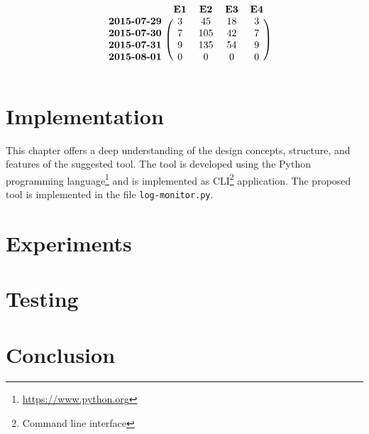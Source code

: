 \begin{equation}
    \begin{blockarray}{ccccc}
    &   \textbf{E1}&     \textbf{E2}&     \textbf{E3}&     \textbf{E4} \\
    \begin{block}{c(cccc)}
   \textbf{ 2015{\text -}07{\text -}29}&    3&      45&     18&     3 \\
   \textbf{ 2015{\text -}07{\text -}30}&    7&      105&    42&     7 \\
   \textbf{ 2015{\text -}07{\text -}31}&    9&      135&    54&     9 \\
   \textbf{ 2015{\text -}08{\text -}01}&    0&      0&      0&      0 \\
    \end{block}
    \end{blockarray}
    \label{eq:count-matrix}
\end{equation}

\chapter{Implementation}
\label{chap:implementation}
This chapter offers a deep understanding of the design concepts, structure, and features of the suggested tool. The tool is developed using the Python programming language\footnote{\url{https://www.python.org}} and is implemented as CLI\footnote{Command line interface} application. The proposed tool is implemented in the file \texttt{log-monitor.py}.

\chapter{Experiments}
\label{chap:experiments}


\chapter{Testing}
\label{chap:testing}


\chapter{Conclusion}
\label{chap:conclusion}
